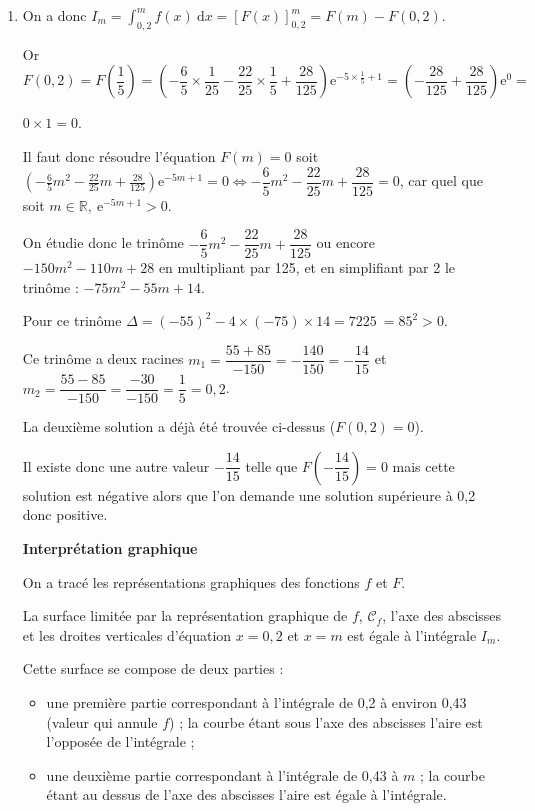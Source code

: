 \documentclass[10pt]{article}
\providecommand{\R}{\mathbb{R}}
\providecommand{\e}{{\mathrm{e}}}
\providecommand{\np}[2][]{{#2~#1}}
\begin{document}
\begin{enumerate}
\begin{enumerate}
$ \left(6x^2 - 2x + 2\right)\e^{-5x+ 1} = f(x)$.

Sur $\R$, \: $F'(x)  = f(x)$ montre que $F$ est une primitive de la fonction $f$.
		\item 


On a donc $I_m = \displaystyle\int_{0,2}^m f(x)\:\text{d}x = \left[F(x) \right]_{0,2}^m = F(m) - F(0,2).$

Or $F(0,2) = F\left(\dfrac15\right) = \left(-\dfrac65 \times \dfrac{1}{25} - \dfrac{22}{25}\times \dfrac{1}{5} + \dfrac{28}{125}\right)\e^{-5\times \frac{1}{5}+ 1} = \left(- \dfrac{28}{125} + \dfrac{28}{125} \right)\e^{0} = $

$0 \times 1 = 0$.

Il faut donc résoudre l'équation $F(m) = 0$ soit $\left(-\frac65m^2 - \frac{22}{25}m + \frac{28}{125}\right)\e^{-5m+ 1} = 0 \iff -\dfrac65 m^2 - \dfrac{22}{25}m + \dfrac{28}{125} = 0$, car quel que soit $m \in \R , \:\e^{-5m+ 1} > 0$.

On étudie donc le trinôme $-\dfrac65 m^2 - \dfrac{22}{25}m + \dfrac{28}{125}$ ou encore $-150m^2 - 110m + 28$ en multipliant par 125, et en simplifiant par 2 le trinôme : $- 75m^2 - 55m + 14$.

Pour ce trinôme $\Delta = (- 55)^2 - 4 \times (- 75) \times 14 = \np{7225} = 85^2 > 0$.

Ce trinôme a deux racines $m_1 = \dfrac{55 + 85}{-150} = - \dfrac{140}{150} = - \dfrac{14}{15}$ et $m_2 = \dfrac{55 - 85}{-150} =  \dfrac{- 30}{-150} = \dfrac15 = 0,2$.

La deuxième solution a déjà été trouvée ci-dessus ($F(0,2) = 0$).

Il existe donc une autre valeur $- \dfrac{14}{15}$ telle que $F\left(- \dfrac{14}{15}\right) = 0$ mais cette solution est négative alors que l'on demande une solution supérieure à 0,2 donc positive.

\textbf{Interprétation graphique}

On a tracé les représentations graphiques des fonctions $f$ et $F$.

La surface limitée par la représentation graphique de $f$, \: $\mathcal{C}_f$, l'axe des abscisses et les droites verticales d'équation $x = 0,2$ et $x = m$ est égale à l'intégrale $I_m$.

Cette surface se compose de deux parties :

\begin{itemize}
\item une première partie correspondant à l'intégrale de 0,2 à environ 0,43 (valeur qui annule $f$) ; la courbe étant sous l'axe des abscisses l'aire  est l'opposée de l'intégrale ;
\item une deuxième partie correspondant à l'intégrale de 0,43 à $m$  ; la courbe étant au dessus  de l'axe des abscisses l'aire  est égale à  l'intégrale.


\end{itemize}
\end{enumerate}
\end{enumerate}
\end{document}
